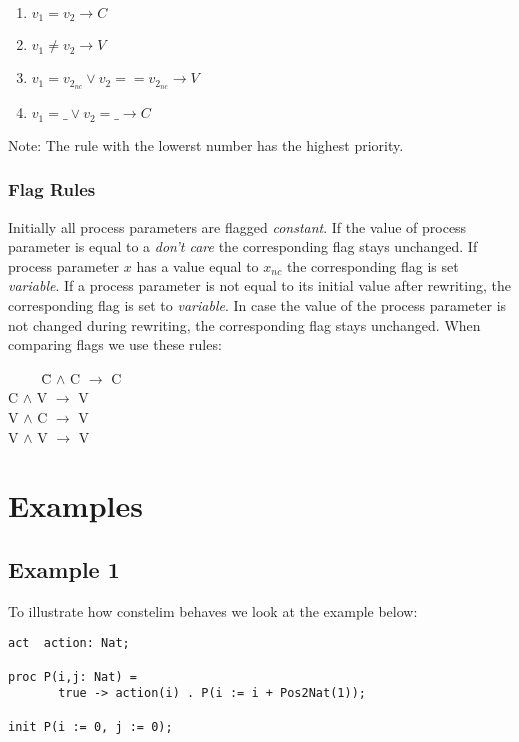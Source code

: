 \documentclass[a4paper,9pt]{article}
\begin{document}
\begin{enumerate}
\item $ v_{1} = v_{2} \rightarrow C $
\item $ v_{1} \neq v_{2} \rightarrow V $
\item $ v_{1} = v_{2_{nc}} \vee v_{2} == v_{2_{nc}} \rightarrow V$
\item $ v_{1} = \_  \vee v_{2} = \_ \rightarrow C $
\end{enumerate}
Note: The rule with the lowerst number has the highest priority.

\subsubsection*{Flag Rules} 
Initially all process parameters are flagged \textit{constant}.
If the value of process parameter is equal to a \textit{don't care} the corresponding flag stays unchanged.
If process parameter $x$ has a value equal to $x_{nc}$ the corresponding flag is set \textit{variable}.
If a process parameter is not equal to its initial value after rewriting, the corresponding flag is set to \textit{variable}.
In case the value of the process parameter is not changed during rewriting, the corresponding flag stays unchanged.
When comparing flags we use these rules: 
\begin{tabbing}
\verb"    " \= C $\wedge$ C $\rightarrow$ C \\
\> C $\wedge$ V $\rightarrow$ V \\
\> V $\wedge$ C $\rightarrow$ V \\
\> V $\wedge$ V $\rightarrow$ V \\
\end{tabbing}


\section{Examples}
\subsection{Example 1}
To illustrate how constelim behaves we look at the example below:
\begin{verbatim}
act  action: Nat;

proc P(i,j: Nat) =
       true -> action(i) . P(i := i + Pos2Nat(1));

init P(i := 0, j := 0);
\end{verbatim}
\end{document}
